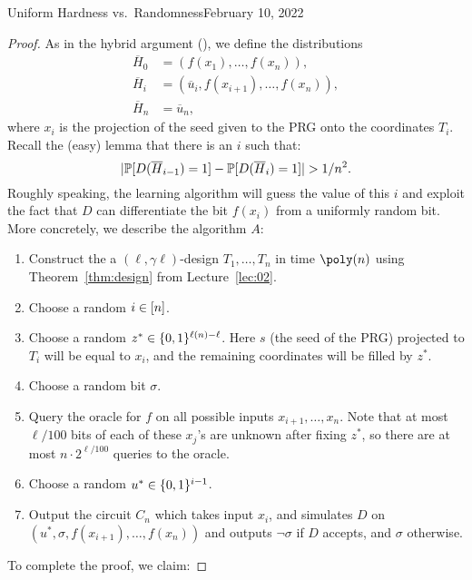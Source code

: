 \begin{lecture}{4}{Uniform Hardness vs.\ Randomness}{February 10, 2022}
\begin{proof}
  As in the hybrid argument (), we define the
  distributions
  \begin{align*}
    \overline{H}_0 &= (f(x_1), \ldots, f(x_n)),\\
    \overline{H}_i &= (\overline{u}_i, f(x_{i + 1}), \ldots, f(x_n)),\\
    \overline{H}_n &= \overline{u}_n,
  \end{align*}
  where $x_i$ is the projection of the seed given to the PRG onto the
  coordinates $T_i$. Recall the (easy) lemma that there is an $i$ such that:
  \[
    \lvert\mathbb{P}[D(\overline{H}_{i - 1}) = 1] - \mathbb{P}[D(\overline{H}_i) = 1]\rvert > 1 / n^2.
  \]
  Roughly speaking, the learning algorithm will guess the value of this $i$ and
  exploit the fact that $D$ can differentiate the bit $f(x_i)$ from a uniformly
  random bit. More concretely, we describe the algorithm $A$:
  \begin{enumerate}
    \item Construct the a $(\ell, \gamma \ell)$-design $T_1, \dots, T_n$ in
      time $\poly(n)$ using Theorem~\ref{thm:design} from
      Lecture~\ref{lec:02}.
    \item Choose a random $i \in [n]$.
    \item Choose a random $z^* \in \{0, 1\}^{\ell(n) - \ell}$. Here $s$
      (the seed of the PRG) projected to $T_i$ will be equal to $x_i$,
      and the remaining coordinates will be filled by $z^*$.
    \item Choose a random bit $\sigma$.
    \item Query the oracle for $f$ on all possible inputs
      $x_{i + 1}, \ldots , x_n$. Note that at most $\ell / 100$ bits of
      each of these $x_j$'s are unknown after fixing $z^*$, so there
      are at most $n \cdot 2^{\ell / 100}$ queries to the oracle.
    \item Choose a random $u^* \in \{0, 1\}^{i - 1}$.
    \item Output the circuit $C_n$ which takes input $x_i$, and simulates
      $D$ on $(u^*, \sigma, f(x_{i + 1}), \ldots , f(x_n))$ and outputs
      $\lnot \sigma$ if $D$ accepts, and $\sigma$ otherwise.
  \end{enumerate}
  To complete the proof, we claim:


\end{proof}
\end{lecture}
